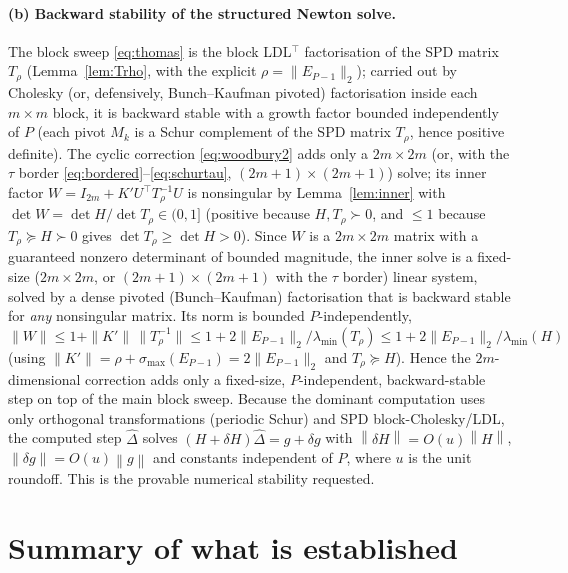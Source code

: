 \documentclass{amsart}
\newcommand{\norm}[1]{\left\lVert#1\right\rVert}
\begin{document}
\paragraph{(b) Backward stability of the structured Newton solve.}
The block sweep \eqref{eq:thomas} is the block LDL$^{\!\top}$ factorisation of the SPD
matrix $T_\rho$ (Lemma~\ref{lem:Trho}, with the explicit $\rho=\|E_{P-1}\|_2$);
carried out by Cholesky (or, defensively, Bunch--Kaufman pivoted) factorisation inside
each $m\times m$ block, it is backward stable with a growth factor bounded
independently of $P$ (each pivot $M_k$ is a Schur complement of the SPD matrix
$T_\rho$, hence positive definite). The cyclic correction \eqref{eq:woodbury2} adds
only a $2m\times2m$ (or, with the $\tau$ border \eqref{eq:bordered}--\eqref{eq:schurtau},
$(2m{+}1)\times(2m{+}1)$) solve; its inner factor $W=I_{2m}+K'U^{\!\top}T_\rho^{-1}U$ is
nonsingular by Lemma~\ref{lem:inner} with $\det W=\det H/\det T_\rho\in(0,1]$
(positive because $H,T_\rho\succ0$, and $\le1$ because $T_\rho\succeq H\succ0$ gives
$\det T_\rho\ge\det H>0$). Since $W$ is a $2m\times2m$ matrix with a guaranteed
nonzero determinant of bounded magnitude, the inner solve is a fixed-size
($2m\times2m$, or $(2m{+}1)\times(2m{+}1)$ with the $\tau$ border) linear system,
solved by a dense pivoted (Bunch--Kaufman) factorisation that is backward stable for
\emph{any} nonsingular matrix. Its norm is bounded $P$-independently,
$\|W\|\le1+\|K'\|\,\|T_\rho^{-1}\|\le1+2\|E_{P-1}\|_2/\lambda_{\min}(T_\rho)
\le1+2\|E_{P-1}\|_2/\lambda_{\min}(H)$ (using $\|K'\|=\rho+\sigma_{\max}(E_{P-1})
=2\|E_{P-1}\|_2$ and $T_\rho\succeq H$). Hence the $2m$-dimensional correction adds
only a fixed-size, $P$-independent, backward-stable step on top of the main block
sweep. Because the dominant
computation uses only orthogonal transformations (periodic Schur) and SPD
block-Cholesky/LDL, the computed step $\widehat\Delta$ solves
$(H+\delta H)\widehat\Delta=g+\delta g$ with $\norm{\delta H}=O(u)\norm H$,
$\norm{\delta g}=O(u)\norm g$ and constants independent of $P$, where $u$ is the unit
roundoff. This is the provable numerical stability requested.

\section{Summary of what is established}\label{sec:summary}
\end{document}
